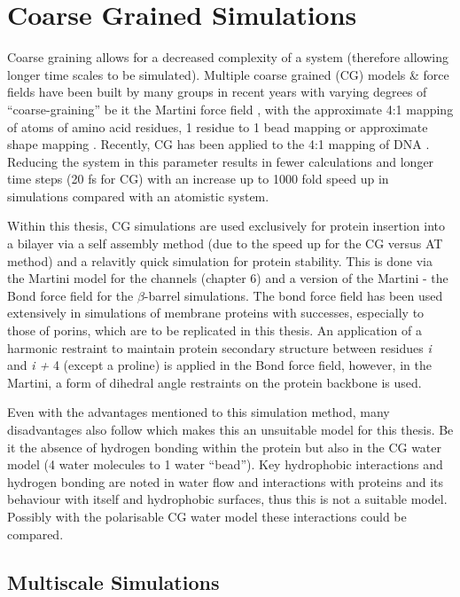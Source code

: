 \section{Coarse Grained Simulations}

Coarse graining allows for a decreased complexity of a system (therefore allowing longer time scales to be simulated). Multiple coarse grained (CG) models \& force fields have been built by many groups in recent years with varying degrees of ``coarse-graining'' be it the Martini force field \cite{Marrink2007}, with the approximate 4:1 mapping of atoms of amino acid residues, 1 residue to 1 bead mapping \cite{Shih2006} or approximate shape mapping \cite{Arkhipov2006}. Recently, CG has been applied to the 4:1 mapping of DNA \cite{Uusitalo2015}. Reducing the system in this parameter results in fewer calculations and longer time steps (20 fs for CG) with an increase up to 1000 fold speed up in simulations compared with an atomistic system. 

Within this thesis, CG simulations are used exclusively for protein insertion into a bilayer via a self assembly method (due to the speed up for the CG versus AT method) and a relavitly quick simulation for protein stability. This is done via the Martini model \cite{Marrink2007} for the channels (chapter 6) and a version of the Martini - the Bond force field \cite{Bond2006} for the $\beta$-barrel simulations. The bond force field has been used extensively in simulations of membrane proteins with successes, especially to those of porins, which are to be replicated in this thesis. An application of a harmonic restraint to maintain protein secondary structure between residues \textit{i} and \textit{i + }4 (except a proline) is applied in the Bond force field, however, in the Martini, a form of dihedral angle restraints on the protein backbone is used. 

Even with the advantages mentioned to this simulation method, many disadvantages also follow which makes this an unsuitable model for this thesis. Be it the absence of hydrogen bonding within the protein but also in the CG water model (4 water molecules to 1 water ``bead''). Key hydrophobic interactions and hydrogen bonding are noted in water flow and interactions with proteins and its behaviour with itself and hydrophobic surfaces, thus this is not a suitable model. Possibly with the polarisable CG water model \cite{Yesylevskyy2010b} these interactions could be compared. 

\subsection{Multiscale Simulations}

